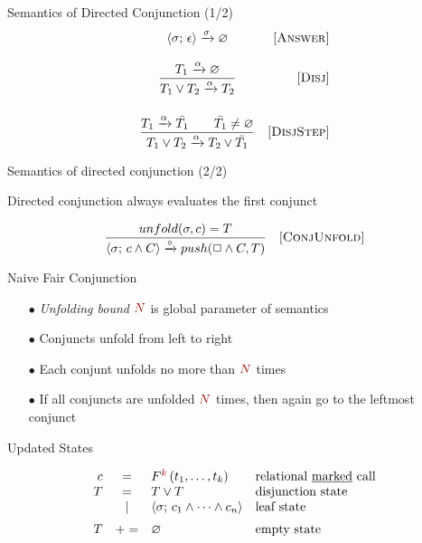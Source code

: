 \documentclass[14pt,aspectratio=169]{beamer}
\let\\\tabularnewline
\let\\\tabularnewline
\newcommand{\ruleno}[1]{\mbox{[\textsc{#1}]}}
\newcommand{\inbr}[1]{\langle #1 \rangle}
\renewcommand{\emptyset}{\varnothing}
\theoremstyle{definition}
\begin{document}
\begin{frame}[fragile]{Semantics of Directed Conjunction (1/2)}
\[\begin{array}{cr}
     {\inbr{\sigma;\, \epsilon} \xrightarrow{\sigma} \emptyset}  
&     \ruleno{Answer} \\[4mm]
\dfrac{T_1 \xrightarrow{\alpha} \emptyset}
      {T_1 \lor T_2 \xrightarrow{\alpha} T_2}
&     \ruleno{Disj} \\[8mm]
\dfrac{T_1 \xrightarrow{\alpha} \bar{T_1} \qquad \bar{T_1} \not= \emptyset}
      {T_1 \lor T_2 \xrightarrow{\alpha} T_2 \lor\bar{T_1}}
&     \ruleno{DisjStep}
\end{array}\]
\end{frame}

\begin{frame}[fragile]{Semantics of directed conjunction (2/2)}

\begin{center}
    Directed conjunction always evaluates the first conjunct 
\end{center}

\[\begin{array}{cr}
\dfrac{unfold(\sigma, c) = T}
      {\inbr{\sigma;\, c \land C} \xrightarrow{\circ} push(\Box \land C, T)}
&     \ruleno{ConjUnfold}
\end{array}\]
\end{frame}

\begin{frame}[fragile]{Naive Fair Conjunction}
\begin{itemize}
    \item[$\bullet$] \emph{Unfolding bound} $\textcolor{myRed}{N}$ is global parameter of semantics
    \item[$\bullet$] Conjuncts unfold from left to right
    \item[$\bullet$] Each conjunt unfolds no more than $\textcolor{myRed}{N}$ times
    \item[$\bullet$] If all conjuncts are unfolded $\textcolor{myRed}{N}$ times, then again go to the leftmost conjunct
\end{itemize}
\end{frame}

\begin{frame}[fragile]{Updated States}

\[
\begin{array}{rcll}
  c & = & F^{\textcolor{myRed}{k}}\,(t_1,\dots,t_k) & \mbox{relational \underline{marked} call} \\
  T & = & T \lor T & \mbox{disjunction state} \\
               & \mid & \inbr{\sigma;\, c_1 \land \dots \land c_n} & \mbox{leaf state}\\[2mm]
T & +=& \emptyset & \mbox{empty state}
\end{array}
\]

\end{frame}
\end{document}
